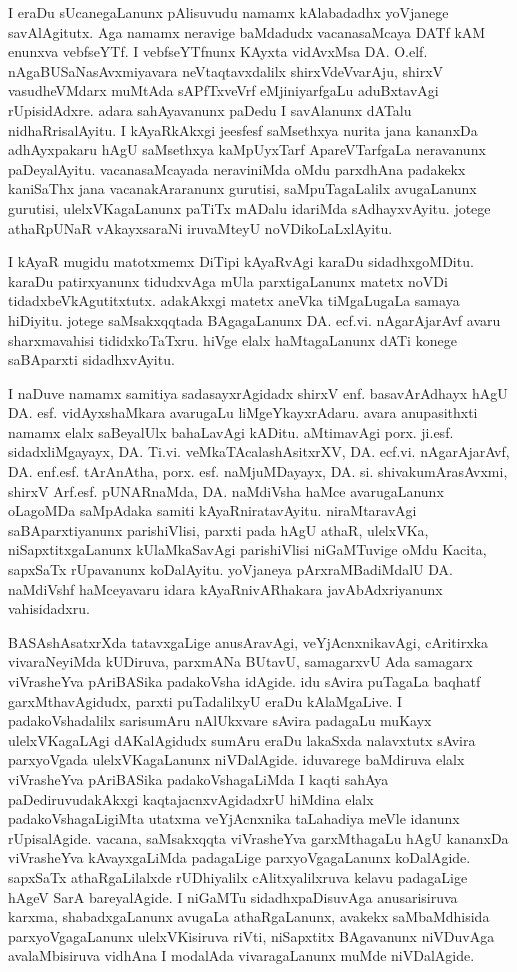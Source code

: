 I eraDu sUcanegaLanunx pAlisuvudu namamx kAlabadadhx yoVjanege savAlAgitutx. Aga namamx neravige baMdadudx vacanasaMcaya DATf kAM enunxva vebfseYTf.  I vebfseYTfnunx KAyxta vidAvxMsa DA. O.elf. nAgaBUSaNasAvxmiyavara neVtaqtavxdalilx shirxV\break deVvarAju, shirxV vasudheVMdarx muMtAda sAPfTxveVrf eMjiniyarfgaLu aduBxtavAgi rUpisidAdxre. adara sahAyavanunx paDedu I savAlanunx dATalu nidhaRrisalAyitu. I kAyaRkAkxgi jeesfesf saMsethxya nurita  jana kananxDa adhAyxpakaru hAgU \hbox{saMsethxya} kaMpUyxTarf ApareVTarfgaLa neravanunx paDeyalAyitu. vacanasaMcayada neraviniMda oMdu parxdhAna padakekx kaniSaThx  jana vacanakAraranunx gurutisi, saMpuTagaLalilx avugaLanunx gurutisi, ulelxVKagaLanunx paTiTx mADalu idariMda sAdhayxvAyitu. jotege athaRpUNaR vAkayxsaraNi iruvaMteyU noVDikoLaLxlAyitu.

\eject

I kAyaR mugidu matotxmemx DiTipi kAyaRvAgi karaDu sidadhxgoMDitu. karaDu patirxyanunx tidudxvAga mUla parxtigaLanunx matetx noVDi tidadxbeVkAgutitxtutx. adakAkxgi matetx aneVka tiMgaLugaLa samaya hiDiyitu. jotege saMsakxqqtada BAgagaLanunx DA. ecf.vi. nAgarAjarAvf avaru sharxmavahisi tididxkoTaTxru. hiVge elalx haMtagaLanunx dATi konege saBAparxti sidadhxvAyitu.

I naDuve namamx samitiya sadasayxrAgidadx shirxV enf. basavArAdhayx hAgU DA. esf. vidAyxshaMkara avarugaLu liMgeYkayxrAdaru. avara anupasithxti namamx elalx saBeyalUlx bahaLavAgi kADitu. aMtimavAgi porx. ji.esf. sidadxliMgayayx, DA. Ti.vi. veMkaTAcala\-shAsitxrXV, DA. ecf.vi. nAgarAjarAvf, DA. enf.esf. tArAnAtha, porx. esf. naMjuMDayayx, DA. si. shivakumArasAvxmi,  shirxV Arf.esf. pUNARnaMda, DA. naMdiVsha haMce avarugaLanunx oLagoMDa saMpAdaka samiti kAyaRniratavAyitu. niraMtaravAgi saBAparxtiyanunx parishiVlisi, parxti pada hAgU athaR, ulelxVKa, niSapxtitxgaLanunx kUlaMkaSavAgi parishiVlisi niGaMTuvige oMdu Kacita, sapxSaTx rUpavanunx koDalAyitu. yoVjaneya pArxraMBadiMdalU DA. naMdiVshf haMceyavaru idara kAyaRnivARhakara javAbAdxri\-yanunx vahisidadxru.

BASAshAsatxrXda tatavxgaLige anusAravAgi, veYjAcnxnikavAgi, cAritirxka vivaraNeyiMda kUDiruva, parxmANa BUtavU, samagarxvU Ada samagarx viVrasheYva pAriBASika padakoVsha idAgide. idu sAvira puTagaLa baqhatf garxMthavAgidudx, parxti puTadalilxyU eraDu kAlaMgaLive. I padakoVshadalilx sarisumAru nAlUkxvare sAvira padagaLu muKayx ulelxVKagaLAgi dAKalAgidudx sumAru eraDu lakaSxda nalavxtutx sAvira parxyoVgada ulelxVKagaLanunx niVDalAgide. iduvarege baMdiruva elalx viVrasheYva pAriBASika padakoVsha\-gaLiMda I kaqti sahAya paDediruvudakAkxgi kaqtajacnxvAgidadxrU hiMdina elalx padakoVshagaLigiMta utatxma veYjAcnxnika taLahadiya meVle idanunx rUpisalAgide. vacana, saMsakxqqta viVrasheYva garxMthagaLu hAgU kananxDa viVrasheYva kAvayxgaLiMda  padagaLige parxyoVgagaLanunx koDalAgide. sapxSaTx athaRgaLilalxde rUDhiyalilx cAlitxyalilxruva kelavu padagaLige hAgeV SarA bareyalAgide. I niGaMTu sidadhxpaDisu\-vAga anusarisiruva karxma, shabadxgaLanunx avugaLa athaRgaLanunx, avakekx saMbaMdhisida parxyoVgagaLanunx ulelxVKisiruva riVti, niSapxtitx BAgavanunx niVDuvAga avalaMbisiruva vidhAna I modalAda vivaragaLanunx muMde niVDalAgide.

